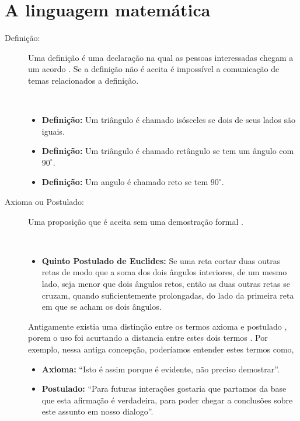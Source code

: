 \section{A linguagem matemática}

\begin{description}

\item[Definição:]  Uma definição é uma declaração na qual as pessoas interessadas chegam a um acordo \cite[pp. 37]{solow1987como}.
Se a definição não é aceita é impossível a comunicação de temas relacionados a definição.
\begin{example}~\\
\begin{itemize}
\item \textbf{Definição:} Um triângulo é chamado isósceles se dois de seus lados são iguais.
\item \textbf{Definição:} Um triângulo é chamado retângulo se tem um ângulo com $90^{\circ}$.
\item \textbf{Definição:} Um angulo é chamado reto se tem  $90^{\circ}$.
\end{itemize}
\end{example}

\item[Axioma ou Postulado:]   
Uma proposição que é aceita sem uma demostração formal \cite[pp. 47]{fossa2009introducao} \cite[pp. 41]{solow1987como}.
\begin{example}~\\
\begin{itemize}
\item \textbf{Quinto Postulado de Euclides:} Se uma reta cortar duas outras retas de modo que a soma dos dois ângulos interiores, de um mesmo lado, seja menor que dois ângulos retos, então as duas outras retas se cruzam, quando suficientemente prolongadas, do lado da primeira reta em que se acham os dois ângulos.
\end{itemize}
\end{example}

Antigamente existia uma distinção entre os termos axioma e postulado \cite[pp. 115]{de1863ensaio},
porem o uso foi acurtando a distancia entre estes dois termos \cite[pp. 243]{mora2000dicionario}.
Por exemplo, nessa antiga concepção, poderíamos entender estes termos como,
\begin{itemize}
\item \textbf{Axioma:} ``Isto é assim porque é evidente, não preciso demostrar''.
\item \textbf{Postulado:} ``Para futuras interações gostaria que partamos da base que esta afirmação é verdadeira,
 para poder chegar a conclusões sobre este assunto em nosso dialogo''.
\end{itemize}



\end{description}

